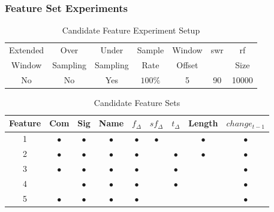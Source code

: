 \subsubsection{Feature Set Experiments}
\label{sec:feature_set_experiment_rf}

\begin{table}[h]
\begin{center}

    \begin{tabular}{|c|c|c|c|c|c|c|}
        \hline
        Extended & Over & Under & Sample & Window & \gls{swr} & \gls{rf} \\
        Window & Sampling & Sampling & Rate & Offset &  & Size \\ \hline
        No & No & Yes & $100\%$ & 5 & 90 & 10000 \\ \hline
    \end{tabular}
    \caption{Candidate Feature Experiment Setup}
    \label{tab:rf_feature_experiment_setup}
\end{center}

\end{table}




\begin{table}[h]
\begin{center}

    \begin{tabular}{|c|c|c|c|c|c|c|c|c|}
        \hline
        Feature & Com & Sig & Name & $f_{\Delta}$ & $sf_{\Delta}$ & $t_\Delta$ & Length & $change_{t-1}$ \\
         \hline
        1 & $\bullet$ & $\bullet$ & $\bullet$ & $\bullet$ & $\bullet$ & & $\bullet$ & $\bullet$ \\
        2 & $\bullet$ & $\bullet$ & $\bullet$ & $\bullet$ & & $\bullet$ & $\bullet$ & $\bullet$ \\
        3 & $\bullet$ & $\bullet$ & $\bullet$ & $\bullet$ & & $\bullet$ & & $\bullet$ \\
        4 & & $\bullet$ & $\bullet$ & $\bullet$ & & $\bullet$ & & $\bullet$ \\
        5 & $\bullet$ & $\bullet$ & $\bullet$ & $\bullet$ & & & & $\bullet$ \\ \hline
    \end{tabular}
    \caption{Candidate Feature Sets}
    \label{tab:rf_feature_experiment_sets}
\end{center}

\end{table}

